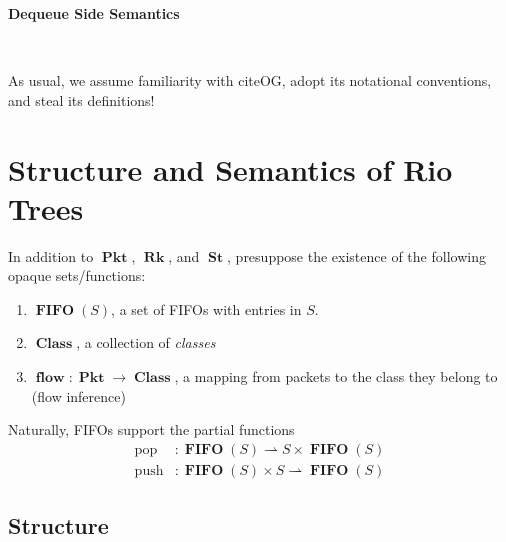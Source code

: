 \documentclass{amsart}
\makeatletter
\newcommand{\inference}[3]{\inferrule*[Right=#1]{#2}{#3}}
\DeclareMathOperator{\halfto}{\rightharpoonup}
\DeclareMathOperator{\push}{\mathrm{push}}
\DeclareMathOperator{\pop}{\mathrm{pop}}
\DeclareMathOperator{\Pkt}{\mathbf{Pkt}}
\DeclareMathOperator{\Rk}{\mathbf{Rk}}
\DeclareMathOperator{\St}{\mathbf{St}}
\DeclareMathOperator{\Rio}{\mathbf{Rio}}
\DeclareMathOperator{\RR}{\mathbf{rr}}
\DeclareMathOperator{\Fifo}{\mathbf{fifo}}
\DeclareMathOperator{\Class}{\mathbf{Class}}
\DeclareMathOperator{\flow}{\mathbf{flow}}
\DeclareMathOperator{\FIFO}{\mathbf{FIFO}}
\theoremstyle{definition}
\newtheorem{dfn}[thm]{Definition}
\newcommand{\reqnomode}{\tagsleft@false\let\veqno\@@eqno}
\makeatother
\begin{document}
\pagestyle{empty}

{\LARGE \textbf{Dequeue Side Semantics}}

\hrulefill\\

\reqnomode

As usual, we assume familiarity with citeOG, adopt its notational conventions, and steal its definitions!

\section{Structure and Semantics of Rio Trees}

In addition to $\Pkt$, $\Rk$, and $\St$, presuppose the existence of the following opaque sets/functions:
\begin{enumerate}
    \item $\FIFO(S)$, a set of FIFOs with entries in $S$.
    \item $\Class$, a collection of \emph{classes}
    \item $\flow : \Pkt \to \Class$, a mapping from packets to the class they belong to (flow inference)
\end{enumerate}

Naturally, FIFOs support the partial functions
\begin{align*}
    \pop  &: \FIFO(S) \halfto S \times \FIFO(S)\\
    \push &: \FIFO(S) \times S \halfto \FIFO(S)
\end{align*}

\subsection{Structure}

\end{document}
